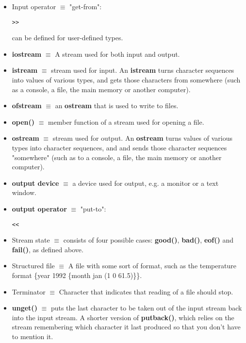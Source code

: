 \documentclass[12pt]{article}
\begin{document}
\begin{itemize}
\item Input operator $\equiv$ "get-from": 

\begin{lstlisting}
>>
\end{lstlisting}

can be defined for user-defined types. 

\item \textbf{iostream} $\equiv$ A stream used for both input and output.

\item \textbf{istream} $\equiv$ stream used for input. An \textbf{istream} turns character sequences into values of various types, and gets those characters from somewhere (such as a console, a file, the main memory or another computer).

\item \textbf{ofstream} $\equiv$ an \textbf{ostream} that is used to write to files.

\item \textbf{open()} $\equiv$ member function of a stream used for opening a file.

\item \textbf{ostream} $\equiv$ stream used for output. An \textbf{ostream} turns values of various types into character sequences, and and sends those character sequences "somewhere" (such as to a console, a file, the main memory or another computer).

\item \textbf{output device} $\equiv$ a device used for output, e.g. a monitor or a text window.

\item \textbf{output operator} $\equiv$ "put-to":

\begin{lstlisting}
<<
\end{lstlisting}

\item Stream state $\equiv$ consists of four possible cases: \textbf{good()}, \textbf{bad()}, \textbf{eof()} and \textbf{fail()}, as defined above.

\item Structured file $\equiv$ A file with some sort of format, such as the temperature format \{year 1992 \{month jan (1 0 61.5)\}\}.

\item Terminator $\equiv$ Character that indicates that reading of a file should stop.

\item \textbf{unget()} $\equiv$ puts the last character to be taken out of the input stream back into the input stream. A shorter version of \textbf{putback()}, which relies on the stream remembering which character it last produced so that you don't have to mention it.


\end{itemize}
\end{document}

